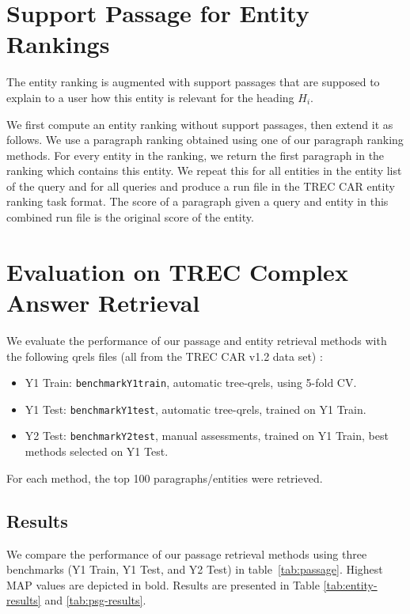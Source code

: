\documentclass{article}
\begin{document}
\section{Support Passage for Entity Rankings}

The entity ranking is augmented with support passages that are supposed to explain to a user how this entity is relevant for the heading $H_i$.

We first compute an entity ranking without support passages, then extend it as follows. We use a paragraph ranking obtained using one of our paragraph ranking methods. For every entity in the ranking, we return the first paragraph in the ranking which contains this entity. We  repeat this for all entities in the entity list of the query and for all queries and produce a run file in the TREC CAR entity ranking task format. The score of a paragraph given a query and entity in this combined run file is the original score of the entity.


\section{Evaluation on TREC Complex Answer Retrieval}


We evaluate the performance of our passage and entity retrieval methods with the following qrels files (all from the TREC CAR v1.2 data set) \cite{trecdata21}:

\begin{itemize}
    \item Y1 Train: \texttt{benchmarkY1train}, automatic tree-qrels, using 5-fold CV.
    \item Y1 Test: \texttt{benchmarkY1test}, automatic tree-qrels, trained on Y1 Train.
    \item Y2 Test: \texttt{benchmarkY2test}, manual assessments, trained on Y1 Train, best methods selected on Y1 Test.
\end{itemize}

For each method, the top 100 paragraphs/entities were retrieved.

\subsection{Results}

We compare the performance of our passage retrieval methods using three benchmarks (Y1 Train, Y1 Test, and Y2 Test) in table~\ref{tab:passage}.
Highest MAP values are depicted in bold. Results are presented in Table \ref{tab:entity-results} and \ref{tab:psg-results}.
\end{document}
